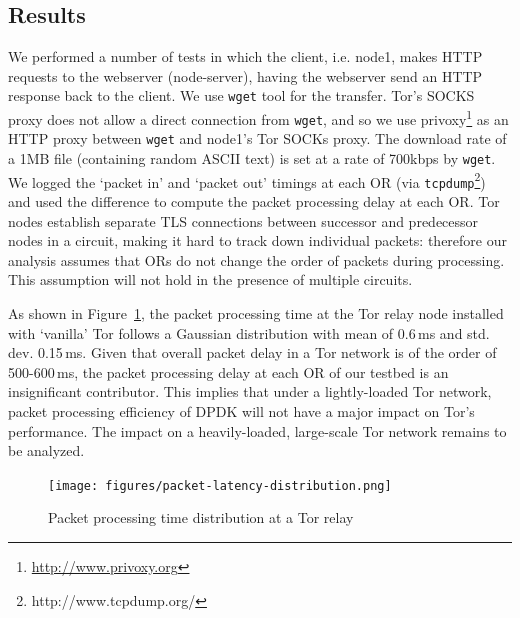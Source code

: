 \documentclass[conference]{IEEEtran}
\begin{document}
\subsection{Results}
\label{subsec:results}

We performed a number of tests in which the client, i.e. node1, makes HTTP requests to the webserver (node-server), having the webserver send an HTTP response back to the client. We use \verb+wget+ tool for the transfer. Tor's SOCKS proxy does not allow a direct connection from \verb+wget+, and so we use privoxy\footnote{\url{http://www.privoxy.org}} as an HTTP proxy between \verb+wget+ and node1's Tor SOCKs proxy. The download rate of a 1MB file (containing random ASCII text) is set at a rate of 700kbps by \verb+wget+. We logged the `packet in' and `packet out' timings at each OR (via \verb+tcpdump+\footnote{http://www.tcpdump.org/}) and used the difference to compute the packet processing delay at each OR. Tor nodes establish separate TLS connections between successor and predecessor nodes in a circuit, making it hard to track down individual packets: therefore our analysis assumes that ORs do not change the order of packets during processing. This assumption will not hold in the presence of multiple circuits. 

As shown in Figure~\ref{fig:result}, the packet processing time at the Tor relay node installed with `vanilla' Tor follows a Gaussian distribution with mean of 0.6\,ms and std. dev. 0.15\,ms. Given that overall packet delay in a Tor network is of the order of 500-600\,ms, the packet processing delay at each OR of our testbed is an insignificant contributor. This implies that under a lightly-loaded Tor network, packet processing efficiency of DPDK will not have a major impact on Tor's performance. The impact on a heavily-loaded, large-scale Tor network remains to be analyzed. 

\begin{figure}[h!]
	\centering
	\texttt{[image: figures/packet-latency-distribution.png]}
	\cprotect\caption{Packet processing time distribution at a Tor relay}
	\label{fig:result}
\end{figure}

\end{document}
